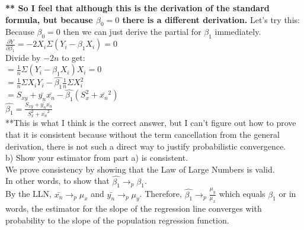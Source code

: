 \documentclass[11pt, oneside]{article}   	%
\begin{document}
\noindent \textbf{** So I feel that although this is the derivation of the standard formula, but because $\beta_0 = 0$ there is a different derivation.} Let's try this:\\
Because $\beta_0 = 0$ then we can just derive the partial for $\beta_1$ immediately. \\
$\frac{\partial Y}{\partial \beta_1} = -2X_i\Sigma(Y_i - \beta_1X_i) = 0$\\
Divide by $-2n$ to get:\\
$= \frac{1}{n}\Sigma(Y_i - \beta_1X_i)X_i = 0$\\
$= \frac{1}{n}\Sigma X_i Y_i - \hat{\beta_1} \frac{1}{n}\Sigma X^2_i$\\
$= S_{xy} + \bar{y_n}\bar{x_n} - \hat{\beta_1}(S^2_x + \bar{x_n}^2)$\\
$\hat{\beta_1} = \frac{S_{xy} + \bar{y_n}\bar{x_n}}{S^2_x + \bar{x_n}^2}$\\
**This is what I think is the correct answer, but I can't figure out how to prove that it is consistent because without the term cancellation from the general derivation, there is not such a direct way to justify probabilistic convergence. \\

\noindent b) Show your estimator from part a) is consistent.\\
We prove consistency by showing that the Law of Large Numbers is valid.\\
In other words, to show that $\hat{\beta_1} \rightarrow_p \beta_1$.\\
By the LLN, $\bar{x_n} \rightarrow_p \mu_x$ and $\bar{y_n} \rightarrow_p \mu_y$.
Therefore, $\hat{\beta_1} \rightarrow_p \frac{\mu_y}{\mu_x}$ which equals $\beta_1$ or in words, the estimator for the slope of the regression line converges with probability to the slope of the population regression function.
\end{document}
